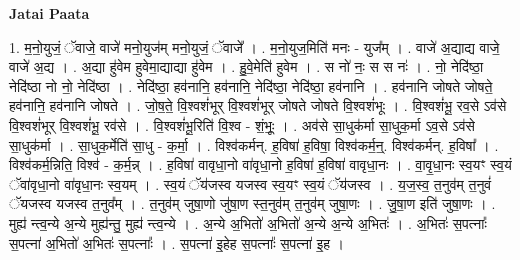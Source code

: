 \documentclass[17pt]{extarticle}
\begin{document}
\textbf{Jatai Paata} \newline

1. म॒नो॒युजं॒ ॅवाजे॒ वाजे॑ मनो॒युज॑म् मनो॒युजं॒ ॅवाजे᳚ । . म॒नो॒युज॒मिति॑ मनः - युज᳚म् । . वाजे॑ अ॒द्याद्य वाजे॒ वाजे॑ अ॒द्य । . अ॒द्या हु॑वेम हुवेमा॒द्याद्या हु॑वेम । . हु॒वे॒मेति॑ हुवेम । . स नो॑ नः॒ स स नः॑ । . नो॒ नेदि॑ष्ठा॒ नेदि॑ष्ठा नो नो॒ नेदि॑ष्ठा । . नेदि॑ष्ठा॒ हव॑नानि॒ हव॑नानि॒ नेदि॑ष्ठा॒ नेदि॑ष्ठा॒ हव॑नानि । . हव॑नानि जोषते जोषते॒ हव॑नानि॒ हव॑नानि जोषते । . जो॒ष॒ते॒ वि॒श्वशं॑भूर् वि॒श्वशं॑भूर् जोषते जोषते वि॒श्वशं॑भूः । . वि॒श्वशं॑भू॒ रव॒से ऽव॑से वि॒श्वशं॑भूर् वि॒श्वशं॑भू॒ रव॑से । . वि॒श्वशं॑भू॒रिति॑ वि॒श्व - शं॒भूः॒ । . अव॑से सा॒धुक॑र्मा सा॒धुक॒र्मा ऽव॒से ऽव॑से सा॒धुक॑र्मा । . सा॒धुक॒र्मेति॑ सा॒धु - क॒र्मा॒ । . विश्व॑कर्मन्. ह॒विषा॑ ह॒विषा॒ विश्व॑कर्म॒न्॒. विश्व॑कर्मन्. ह॒विषा᳚ । . विश्व॑कर्म॒न्निति॒ विश्व॑ - क॒र्म॒न्न् । . ह॒विषा॑ वावृधा॒नो वा॑वृधा॒नो ह॒विषा॑ ह॒विषा॑ वावृधा॒नः । . वा॒वृ॒धा॒नः स्व॒यꣳ स्व॒यं ॅवा॑वृधा॒नो वा॑वृधा॒नः स्व॒यम् । . स्व॒यं ॅय॑जस्व यजस्व स्व॒यꣳ स्व॒यं ॅय॑जस्व । . य॒ज॒स्व॒ त॒नुव॑म् त॒नुवं॑ ॅयजस्व यजस्व त॒नुव᳚म् । . त॒नुव॑म् जुषा॒णो जु॑षा॒ण स्त॒नुव॑म् त॒नुव॑म् जुषा॒णः । . जु॒षा॒ण इति॑ जुषा॒णः । . मुह्य॑ न्त्व॒न्ये अ॒न्ये मुह्य॑न्तु॒ मुह्य॑ न्त्व॒न्ये । . अ॒न्ये अ॒भितो॑ अ॒भितो॑ अ॒न्ये अ॒न्ये अ॒भितः॑ । . अ॒भितः॑ स॒पत्नाः᳚ स॒पत्ना॑ अ॒भितो॑ अ॒भितः॑ स॒पत्नाः᳚ । . स॒पत्ना॑ इ॒हेह स॒पत्नाः᳚ स॒पत्ना॑ इ॒ह । \newline
\end{document}

